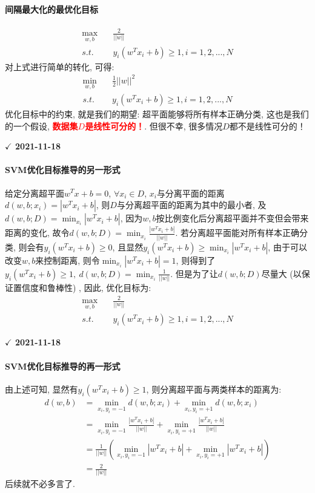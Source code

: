 \paragraph{间隔最大化的最优化目标}
\begin{align}
	\mathop{max}_{w, b}&\quad \frac{2}{||w||} \nonumber \\
	s.t.&\quad y_i(w^T x_i + b) \geqslant 1, i = 1, 2, ..., N \nonumber
\end{align}
对上式进行简单的转化, 可得: 
\begin{align}
	\mathop{min}_{w, b}&\quad \frac{1}{2}||w||^2 \nonumber \\
	s.t.&\quad y_i(w^T x_i + b) \geqslant 1, i = 1, 2, ..., N \nonumber
\end{align}
优化目标中的约束, 就是我们的期望: 超平面能够将所有样本正确分类, 这也是我们的一个假设, \textcolor{red}{\textbf{数据集$D$是线性可分的！}}. 但很不幸, 很多情况$D$都不是线性可分的！

\textbf{$\checkmark$ 2021-11-18}\\
\paragraph{SVM优化目标推导的另一形式}
给定分离超平面$w^T x + b = 0$, $\forall x_i \in D$, $x_i$与分离平面的距离$d(w, b; x_i) = |w^T x_i + b|$, 则$D$与分离超平面的距离为其中的最小者, 及$d(w, b; D) = \mathop{min}_{x_i} |w^T x_i +b|$, 因为$w, b$按比例变化后分离超平面并不变但会带来距离的变化, 故令$d(w, b; D) = \mathop{min}_{x_i} \frac{|w^T x_i + b|}{||w||}$. 若分离超平面能对所有样本正确分类, 则会有$y_i ( w^T x_i + b ) \geq 0$, 且显然$y_i ( w^T x_i + b ) \geq \mathop{min}_{x_i} |w^T x_i + b|$, 由于可以改变$w, b$来控制距离, 则令$\mathop{min}_{x_i} |w^T x_i + b| = 1$, 则得到了$y_i ( w^T x_i + b ) \geq 1,\ d(w, b; D) = \mathop{min}_{x_i} \frac{1}{||w||}$. 但是为了让$d(w, b; D)$尽量大 (以保证置信度和鲁棒性) , 因此, 优化目标为: 
\begin{align}
	\mathop{max}_{w, b}&\quad \frac{2}{||w||} \nonumber \\
	s.t.&\quad y_i(w^T x_i + b) \geqslant 1, i = 1, 2, ..., N \nonumber
\end{align}

\textbf{$\checkmark$ 2021-11-18}\\
\paragraph{SVM优化目标推导的再一形式}
由上述可知, 显然有$y_i ( w^T x_i + b ) \geq 1$, 则分离超平面与两类样本的距离为: 
\begin{align}
	d(w, b) &= \mathop{min}_{x_i, y_i=-1} d(w, b; x_i) + \mathop{min}_{x_i, y_i=+1} d(w, b; x_i) \nonumber \\
			&= 	\mathop{min}_{x_i, y_i=-1} \frac{|w^T x_i + b|}{||w||} + \mathop{min}_{x_i, y_i=+1} \frac{|w^T x_i + b|}{||w||} \nonumber \\
			&= \frac{1}{||w||} ( \mathop{min}_{x_i, y_i=-1} |w^T x_i + b| + \mathop{min}_{x_i, y_i=+1} |w^T x_i + b|) \nonumber \\
			&= \frac{2}{||w||}
\end{align}
后续就不必多言了. 



